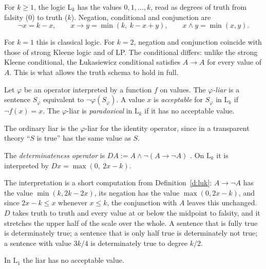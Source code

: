 \documentclass{situationist-preprint}
\begin{document}
\begin{definition}\label{d:luk}
For $k \geq 1$, the logic $\mathrm{L}_k$ has the values $0, 1, \ldots, k$, read as degrees of truth from falsity ($0$) to truth ($k$). Negation, conditional and conjunction are
\[
\neg x = k - x, \qquad x \to y = \min(k,\ k - x + y), \qquad x \wedge y = \min(x, y).
\]
\end{definition}

For $k = 1$ this is classical logic. For $k = 2$, negation and conjunction coincide with those of strong Kleene logic and of LP. The conditional differs: unlike the strong Kleene conditional, the Łukasiewicz conditional satisfies $A \to A$ for every value of $A$. This is what allows the truth schema to hold in full.

\begin{definition}\label{d:fixed}
Let $\varphi$ be an operator interpreted by a function $f$ on values. The \emph{$\varphi$-liar} is a sentence $S_\varphi$ equivalent to $\neg \varphi(S_\varphi)$. A value $x$ is \emph{acceptable} for $S_\varphi$ in $\mathrm{L}_k$ if $\neg f(x) = x$. The $\varphi$-liar is \emph{paradoxical} in $\mathrm{L}_k$ if it has no acceptable value.
\end{definition}

The ordinary liar is the $\varphi$-liar for the identity operator, since in a transparent theory \enquote{$S$ is true} has the same value as $S$.

\begin{definition}\label{d:D}
The \emph{determinateness operator} is $D A := A \wedge \neg (A \to \neg A)$ \citep{Field2003}. On $\mathrm{L}_k$ it is interpreted by $D x = \max(0,\ 2x - k)$.
\end{definition}

The interpretation is a short computation from Definition~\ref{d:luk}: $A \to \neg A$ has the value $\min(k, 2k - 2x)$, its negation has the value $\max(0, 2x - k)$, and since $2x - k \leq x$ whenever $x \leq k$, the conjunction with $A$ leaves this unchanged. $D$ takes truth to truth and every value at or below the midpoint to falsity, and it stretches the upper half of the scale over the whole. A sentence that is fully true is determinately true; a sentence that is only half true is determinately not true; a sentence with value $3k/4$ is determinately true to degree $k/2$.

\begin{proposition}\label{p:classical}
In $\mathrm{L}_1$ the liar has no acceptable value.
\end{proposition}
\end{document}
